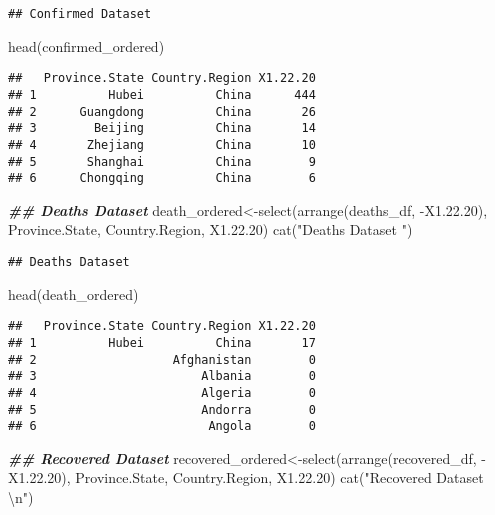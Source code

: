 \documentclass[
]{article}
\newenvironment{Shaded}{\begin{snugshade}}{\end{snugshade}}
\newcommand{\DocumentationTok}[1]{\textcolor[rgb]{0.56,0.35,0.01}{\textbf{\textit{#1}}}}
\newcommand{\FloatTok}[1]{\textcolor[rgb]{0.00,0.00,0.81}{#1}}
\newcommand{\FunctionTok}[1]{\textcolor[rgb]{0.00,0.00,0.00}{#1}}
\newcommand{\NormalTok}[1]{#1}
\newcommand{\OtherTok}[1]{\textcolor[rgb]{0.56,0.35,0.01}{#1}}
\newcommand{\SpecialCharTok}[1]{\textcolor[rgb]{0.00,0.00,0.00}{#1}}
\newcommand{\StringTok}[1]{\textcolor[rgb]{0.31,0.60,0.02}{#1}}
\begin{document}
\begin{verbatim}
## Confirmed Dataset
\end{verbatim}

\begin{Shaded}
\begin{Highlighting}[]
\FunctionTok{head}\NormalTok{(confirmed\_ordered)}
\end{Highlighting}
\end{Shaded}

\begin{verbatim}
##   Province.State Country.Region X1.22.20
## 1          Hubei          China      444
## 2      Guangdong          China       26
## 3        Beijing          China       14
## 4       Zhejiang          China       10
## 5       Shanghai          China        9
## 6      Chongqing          China        6
\end{verbatim}

\begin{Shaded}
\begin{Highlighting}[]
\DocumentationTok{\#\# Deaths Dataset}
\NormalTok{death\_ordered}\OtherTok{\textless{}{-}}\FunctionTok{select}\NormalTok{(}\FunctionTok{arrange}\NormalTok{(deaths\_df, }\SpecialCharTok{{-}}\NormalTok{X1.}\FloatTok{22.20}\NormalTok{), }
\NormalTok{                      Province.State, Country.Region, X1.}\FloatTok{22.20}\NormalTok{)}
\FunctionTok{cat}\NormalTok{(}\StringTok{"Deaths Dataset "}\NormalTok{)}
\end{Highlighting}
\end{Shaded}

\begin{verbatim}
## Deaths Dataset
\end{verbatim}

\begin{Shaded}
\begin{Highlighting}[]
\FunctionTok{head}\NormalTok{(death\_ordered)}
\end{Highlighting}
\end{Shaded}

\begin{verbatim}
##   Province.State Country.Region X1.22.20
## 1          Hubei          China       17
## 2                   Afghanistan        0
## 3                       Albania        0
## 4                       Algeria        0
## 5                       Andorra        0
## 6                        Angola        0
\end{verbatim}

\begin{Shaded}
\begin{Highlighting}[]
\DocumentationTok{\#\# Recovered Dataset}
\NormalTok{recovered\_ordered}\OtherTok{\textless{}{-}}\FunctionTok{select}\NormalTok{(}\FunctionTok{arrange}\NormalTok{(recovered\_df, }\SpecialCharTok{{-}}\NormalTok{X1.}\FloatTok{22.20}\NormalTok{), }
\NormalTok{                          Province.State, Country.Region, X1.}\FloatTok{22.20}\NormalTok{)}
\FunctionTok{cat}\NormalTok{(}\StringTok{"Recovered Dataset }\SpecialCharTok{\textbackslash{}n}\StringTok{"}\NormalTok{)}
\end{Highlighting}
\end{Shaded}
\end{document}
